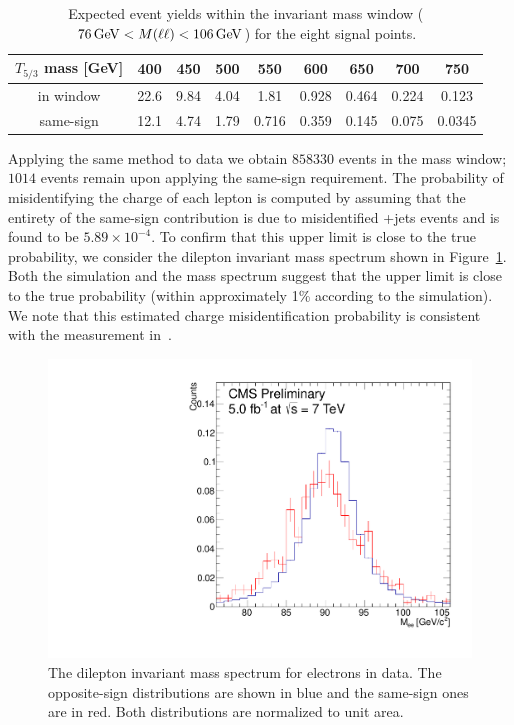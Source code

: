 \begin{table}[htb]
    \centering
\begin{tabular}{*9c}
    \toprule
$T_{5/3}$ mass [GeV]  & 400       & 450       & 500       & 550       & 600       & 650       & 700       & 750       \\ 
\midrule
 in \Z window         & 22.6      & 9.84      & 4.04      & 1.81      & 0.928     & 0.464     & 0.224     & 0.123     \\ 
 same-sign           & 12.1      & 4.74      & 1.79      & 0.716     & 0.359     & 0.145     & 0.075     & 0.0345    \\ 
 \bottomrule
\end{tabular}
\caption{Expected event yields within the \Z invariant mass window
    ($\unit[76]{GeV}< M(\Lep \Lep) <\unit[106]{GeV}$) for the eight \TP signal  points.}
\label{tab:ZWindowSig}
\end{table}


Applying the same method to data we obtain $858330$ events in the \Z mass
window; $1014$ events remain upon applying the same-sign requirement. The probability of misidentifying the charge of each 
lepton is computed by assuming that the entirety of the same-sign contribution is due to misidentified \Z+jets events and is found to be $5.89 \times 10^{-4}$. To confirm that this upper limit is close to the true probability, we consider the dilepton invariant mass spectrum shown in Figure~\ref{fig:ZWindowMassPeak}. Both 
the simulation and the mass spectrum suggest that the upper limit is close
to the true probability (within approximately 1\% according to the
simulation). We note that this  estimated charge misidentification
probability is consistent with the measurement in~\cite{susy2011}.

\begin{figure}[htb]
\centering
\includegraphics[width=.7\textwidth]{images/pdf/ChargeMisID_ZMass.pdf}
\caption{The dilepton invariant mass spectrum for electrons in data. The opposite-sign distributions are shown in blue and 
the same-sign ones are in red. Both distributions are normalized to unit area.}
\label{fig:ZWindowMassPeak}
\end{figure}

